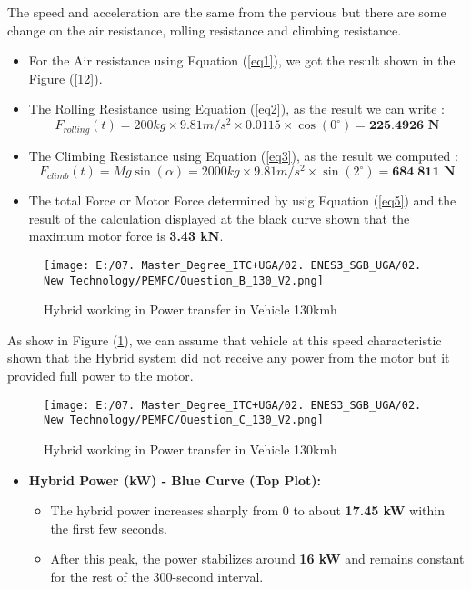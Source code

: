 \documentclass[12pt,a4paper]{article}
\numberwithin{equation}{section}
\begin{document}
{The speed and acceleration are the same from the pervious but there are some change on the air resistance, rolling resistance and climbing	resistance. 

\begin{itemize}
	\item For the Air resistance using Equation (\ref{eq1}), we got the result shown in the Figure (\ref{12}).
	\item The Rolling Resistance using Equation (\ref{eq2}), as the result we can write :
	\begin{equation}
		F_{rolling}(t) = 200kg\times9.81m/s^2\times0.0115\times \cos(0^\circ) = \textbf{225.4926 N}\label{eq13}
	\end{equation}
	\item The Climbing Resistance using Equation (\ref{eq3}), as the result we computed :
	\begin{equation}
		F_{climb}(t) = Mg\sin(\alpha) = 2000kg \times 9.81m/s^2 \times \sin(2^\circ) = \textbf{684.811 N} \label{eq14}
	\end{equation}
	\item The total Force or Motor Force determined by usig Equation (\ref{eq5}) and the result of the calculation displayed at the black curve shown that the maximum motor force is \textbf{3.43 kN}.
\end{itemize}


\begin{figure}[h]
	\centering 
	\texttt{[image: E:/07. Master\_Degree\_ITC+UGA/02. ENES3\_SGB\_UGA/02. New Technology/PEMFC/Question\_B\_130\_V2.png]}
	\caption{\small {Hybrid working in Power transfer in Vehicle 130kmh}}
	\label{13}
\end{figure}

As show in Figure (\ref{13}), we can assume that vehicle at this speed characteristic shown that the Hybrid system did not receive any power from the motor but it provided full power to the motor.

\begin{figure}[h]
	\centering 
	\texttt{[image: E:/07. Master\_Degree\_ITC+UGA/02. ENES3\_SGB\_UGA/02. New Technology/PEMFC/Question\_C\_130\_V2.png]}
	\caption{\small {Hybrid working in Power transfer in Vehicle 130kmh}}
	\label{14}
\end{figure}

\begin{itemize}
	\item \textbf{Hybrid Power (kW) - Blue Curve (Top Plot):}
	\begin{itemize}
		\item The hybrid power increases sharply from 0 to about \textbf{17.45 kW} within the first few seconds.
		\item After this peak, the power stabilizes around \textbf{16 kW} and remains constant for the rest of the 300-second interval.
	\end{itemize}
	

\end{itemize}}
\end{document}

